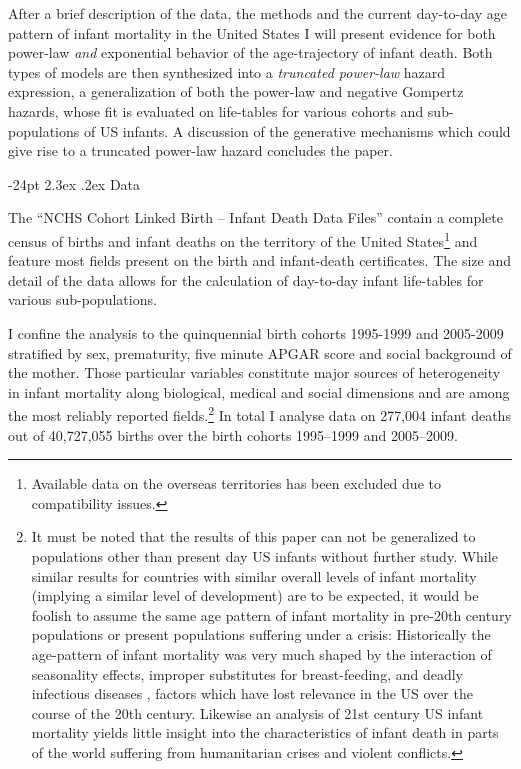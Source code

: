 \documentclass[10pt, twoside, parskip=half]{article}
\makeatletter
\renewcommand\section{\@startsection {section}{1}{\z@}%
                                   {-24pt}%
                                   {2.3ex \@plus.2ex}%
                                   {\normalfont\large\bfseries}}
\makeatother
\begin{document}
After a brief description of the data, the methods and the current
day-to-day age pattern of infant mortality in the United States I will
present evidence for both power-law \emph{and} exponential behavior of
the age-trajectory of infant death. Both types of models are then
synthesized into a \emph{truncated power-law} hazard expression, a
generalization of both the power-law and negative Gompertz hazards,
whose fit is evaluated on life-tables for various cohorts and
sub-populations of US infants. A discussion of the generative mechanisms
which could give rise to a truncated power-law hazard concludes the
paper.

\section{Data}\label{data}

The ``NCHS Cohort Linked Birth -- Infant Death Data Files''
\citep{NCHS2016} contain a complete census of births and infant deaths
on the territory of the United States\footnote{Available data on the
  overseas territories has been excluded due to compatibility issues.}
and feature most fields present on the birth and infant-death
certificates. The size and detail of the data allows for the calculation
of day-to-day infant life-tables for various sub-populations.

I confine the analysis to the quinquennial birth cohorts 1995-1999 and
2005-2009 stratified by sex, prematurity, five minute APGAR score and
social background of the mother. Those particular variables constitute
major sources of heterogeneity in infant mortality along biological,
medical and social dimensions and are among the most reliably reported
fields.\footnote{It must be noted that the results of this paper can not
  be generalized to populations other than present day US infants
  without further study. While similar results for countries with
  similar overall levels of infant mortality (implying a similar level
  of development) are to be expected, it would be foolish to assume the
  same age pattern of infant mortality in pre-20th century populations
  or present populations suffering under a crisis: Historically the
  age-pattern of infant mortality was very much shaped by the
  interaction of seasonality effects, improper substitutes for
  breast-feeding, and deadly infectious diseases
  \citep{Knodel1977, Huck1995}, factors which have lost relevance in the
  US over the course of the 20th century. Likewise an analysis of 21st
  century US infant mortality yields little insight into the
  characteristics of infant death in parts of the world suffering from
  humanitarian crises and violent conflicts.} In total I analyse data on
277,004 infant deaths out of 40,727,055 births over the birth cohorts
1995--1999 and 2005--2009.
\end{document}
